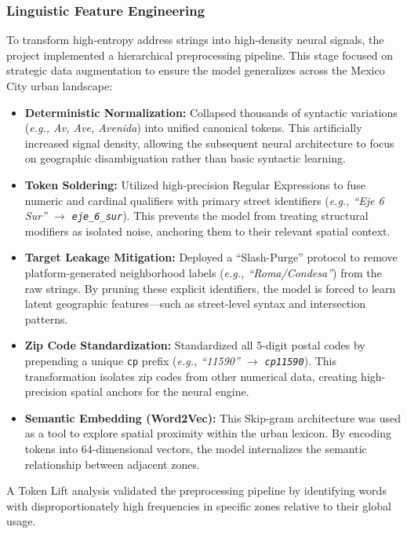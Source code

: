 \subsubsection{Linguistic Feature Engineering}
To transform high-entropy address strings into high-density neural signals, the project implemented a hierarchical preprocessing pipeline. This stage focused on strategic data augmentation to ensure the model generalizes across the Mexico City urban landscape:

\begin{itemize}[noitemsep, topsep=3pt]
    \item \textbf{Deterministic Normalization:} Collapsed thousands of syntactic variations (\textit{e.g., Av, Ave, Avenida}) into unified canonical tokens. This artificially increased signal density, allowing the subsequent neural architecture to focus on geographic disambiguation rather than basic syntactic learning.
    \item \textbf{Token Soldering:} Utilized high-precision Regular Expressions to fuse numeric and cardinal qualifiers with primary street identifiers (\textit{e.g., ``Eje 6 Sur'' $\to$ \texttt{eje\_6\_sur}}). This prevents the model from treating structural modifiers as isolated noise, anchoring them to their relevant spatial context.
    \item \textbf{Target Leakage Mitigation:} Deployed a ``Slash-Purge'' protocol to remove platform-generated neighborhood labels (\textit{e.g., ``Roma/Condesa''}) from the raw strings. By pruning these explicit identifiers, the model is forced to learn latent geographic features---such as street-level syntax and intersection patterns.
    \item \textbf{Zip Code Standardization:} Standardized all 5-digit postal codes by prepending a unique \texttt{cp} prefix (\textit{e.g., ``11590'' $\to$ \texttt{cp11590}}). This transformation isolates zip codes from other numerical data, creating high-precision spatial anchors for the neural engine.
    \item \textbf{Semantic Embedding (Word2Vec):} This Skip-gram architecture was used as a tool to explore spatial proximity within the urban lexicon. By encoding tokens into 64-dimensional vectors, the model internalizes the semantic relationship between adjacent zones.
\end{itemize}

A Token Lift analysis validated the preprocessing pipeline by identifying words with disproportionately high frequencies in specific zones relative to their global usage.

